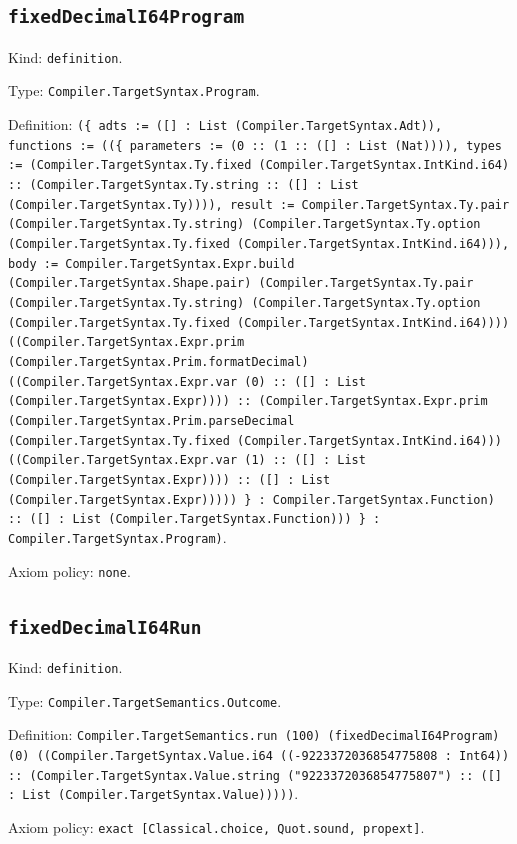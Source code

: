 \documentclass[11pt]{article}
\begin{document}
\subsection*{\texttt{fixedDecimalI64Program}}
\noindent Kind: \texttt{definition}.\par
\noindent Type: \texttt{Compiler.TargetSyntax.Program}.\par
\noindent Definition: \texttt{(\{ adts := ([] : List (Compiler.TargetSyntax.Adt)), functions := ((\{ parameters := (0 :: (1 :: ([] : List (Nat)))), types := (Compiler.TargetSyntax.Ty.fixed (Compiler.TargetSyntax.IntKind.i64) :: (Compiler.TargetSyntax.Ty.string :: ([] : List (Compiler.TargetSyntax.Ty)))), result := Compiler.TargetSyntax.Ty.pair (Compiler.TargetSyntax.Ty.string) (Compiler.TargetSyntax.Ty.option (Compiler.TargetSyntax.Ty.fixed (Compiler.TargetSyntax.IntKind.i64))), body := Compiler.TargetSyntax.Expr.build (Compiler.TargetSyntax.Shape.pair) (Compiler.TargetSyntax.Ty.pair (Compiler.TargetSyntax.Ty.string) (Compiler.TargetSyntax.Ty.option (Compiler.TargetSyntax.Ty.fixed (Compiler.TargetSyntax.IntKind.i64)))) ((Compiler.TargetSyntax.Expr.prim (Compiler.TargetSyntax.Prim.formatDecimal) ((Compiler.TargetSyntax.Expr.var (0) :: ([] : List (Compiler.TargetSyntax.Expr)))) :: (Compiler.TargetSyntax.Expr.prim (Compiler.TargetSyntax.Prim.parseDecimal (Compiler.TargetSyntax.Ty.fixed (Compiler.TargetSyntax.IntKind.i64))) ((Compiler.TargetSyntax.Expr.var (1) :: ([] : List (Compiler.TargetSyntax.Expr)))) :: ([] : List (Compiler.TargetSyntax.Expr))))) \} : Compiler.TargetSyntax.Function) :: ([] : List (Compiler.TargetSyntax.Function))) \} : Compiler.TargetSyntax.Program)}.\par
\noindent Axiom policy: \texttt{none}.\par
\subsection*{\texttt{fixedDecimalI64Run}}
\noindent Kind: \texttt{definition}.\par
\noindent Type: \texttt{Compiler.TargetSemantics.Outcome}.\par
\noindent Definition: \texttt{Compiler.TargetSemantics.run (100) (fixedDecimalI64Program) (0) ((Compiler.TargetSyntax.Value.i64 ((-9223372036854775808 : Int64)) :: (Compiler.TargetSyntax.Value.string ("9223372036854775807") :: ([] : List (Compiler.TargetSyntax.Value)))))}.\par
\noindent Axiom policy: \texttt{exact [Classical.choice, Quot.sound, propext]}.\par
\end{document}
